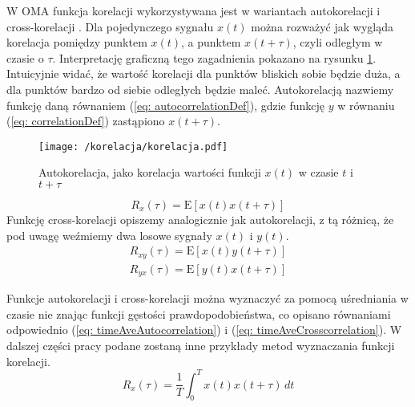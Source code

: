 W OMA funkcja korelacji wykorzystywana jest w wariantach autokorelacji  i cross-korelacji . Dla pojedynczego sygnału $x(t)$ można rozważyć jak wygląda korelacja pomiędzy punktem $x(t)$, a punktem $x(t+\tau)$, czyli odległym w czasie o $\tau$. Interpretację graficzną tego zagadnienia pokazano na rysunku \ref{fig: autocorrelationExample}. Intuicyjnie widać, że wartość korelacji dla punktów bliskich sobie będzie duża, a dla punktów bardzo od siebie odległych będzie maleć. Autokorelacją nazwiemy funkcję daną równaniem (\ref{eq: autocorrelationDef}), gdzie funkcję $y$ w równaniu (\ref{eq: correlationDef}) zastąpiono $x(t+\tau)$. 
\begin{figure}[hbt!] 
	\centering
	\texttt{[image: /korelacja/korelacja.pdf]}
	\captionsetup{justification=centering}
	\caption{Autokorelacja, jako korelacja wartości funkcji $x(t)$ w czasie $t$ i $t+\tau$}
	\label{fig: autocorrelationExample}
\end{figure}
\begin{equation} \label{eq: autocorrelationDef}
	R_x(\tau)=\mathrm{E}[x(t)x(t+\tau)]
\end{equation}
Funkcję cross-korelacji opiszemy analogicznie jak autokorelacji, z tą różnicą, że pod uwagę weźmiemy dwa losowe sygnały $x(t)$ i $y(t)$.
\begin{equation} \label{eq: crosscorrelationDef}
	\begin{aligned}
		R_{xy}(\tau)=\mathrm{E}[x(t)y(t+\tau)]\\	
		R_{yx}(\tau)=\mathrm{E}[y(t)x(t+\tau)]
	\end{aligned}
\end{equation}

Funkcje autokorelacji i cross-korelacji można wyznaczyć za pomocą uśredniania w czasie nie znając funkcji gęstości prawdopodobieństwa, co opisano równaniami odpowiednio (\ref{eq: timeAveAutocorrelation}) i (\ref{eq: timeAveCrosscorrelation}). W dalszej części pracy podane zostaną inne przykłady metod wyznaczania funkcji korelacji.
\begin{equation} \label{eq: timeAveAutocorrelation}
	R_x(\tau) = \frac{1}{T}\int_{0}^{T}x(t)x(t+\tau) \,dt
\end{equation}

